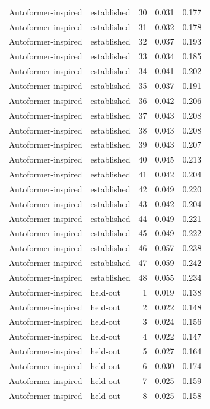 \begin{tabular}{llrrr}
Autoformer-inspired & established & 30 & 0.031 & 0.177 \\
Autoformer-inspired & established & 31 & 0.032 & 0.178 \\
Autoformer-inspired & established & 32 & 0.037 & 0.193 \\
Autoformer-inspired & established & 33 & 0.034 & 0.185 \\
Autoformer-inspired & established & 34 & 0.041 & 0.202 \\
Autoformer-inspired & established & 35 & 0.037 & 0.191 \\
Autoformer-inspired & established & 36 & 0.042 & 0.206 \\
Autoformer-inspired & established & 37 & 0.043 & 0.208 \\
Autoformer-inspired & established & 38 & 0.043 & 0.208 \\
Autoformer-inspired & established & 39 & 0.043 & 0.207 \\
Autoformer-inspired & established & 40 & 0.045 & 0.213 \\
Autoformer-inspired & established & 41 & 0.042 & 0.204 \\
Autoformer-inspired & established & 42 & 0.049 & 0.220 \\
Autoformer-inspired & established & 43 & 0.042 & 0.204 \\
Autoformer-inspired & established & 44 & 0.049 & 0.221 \\
Autoformer-inspired & established & 45 & 0.049 & 0.222 \\
Autoformer-inspired & established & 46 & 0.057 & 0.238 \\
Autoformer-inspired & established & 47 & 0.059 & 0.242 \\
Autoformer-inspired & established & 48 & 0.055 & 0.234 \\
Autoformer-inspired & held-out & 1 & 0.019 & 0.138 \\
Autoformer-inspired & held-out & 2 & 0.022 & 0.148 \\
Autoformer-inspired & held-out & 3 & 0.024 & 0.156 \\
Autoformer-inspired & held-out & 4 & 0.022 & 0.147 \\
Autoformer-inspired & held-out & 5 & 0.027 & 0.164 \\
Autoformer-inspired & held-out & 6 & 0.030 & 0.174 \\
Autoformer-inspired & held-out & 7 & 0.025 & 0.159 \\
Autoformer-inspired & held-out & 8 & 0.025 & 0.158 \\

\end{tabular}
